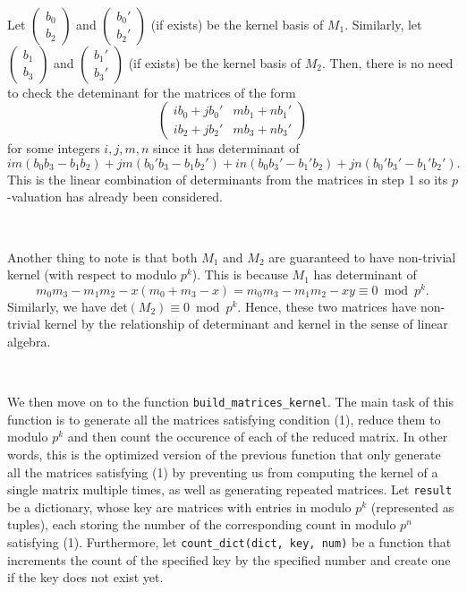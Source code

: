 \documentclass[letterpaper,12pt]{article}
\begin{document}
\

Let $\begin{pmatrix}b_0 \\ b_2 \end{pmatrix}$ and 
$\begin{pmatrix}b_0' \\ b_2' \end{pmatrix}$ (if exists) be the kernel basis of $M_1$.
Similarly, let $\begin{pmatrix}b_1 \\ b_3 \end{pmatrix}$ and 
$\begin{pmatrix}b_1' \\ b_3' \end{pmatrix}$ (if exists) be the kernel basis of $M_2$.
Then, there is no need to check the deteminant for the matrices of the form 
\[
\begin{pmatrix}
ib_0+jb_0' & mb_1+nb_1' \\
ib_2+jb_2' & mb_3+nb_3'
\end{pmatrix}
\]
for some integers $i,j,m,n$ since it has determinant of
\[
im(b_0b_3 - b_1b_2) + jm(b_0'b_3 - b_1b_2')
+ in(b_0b_3' - b_1'b_2) + jn(b_0'b_3' - b_1'b_2') .
\]
This is the linear combination of determinants from the matrices in step 1
so its $p$-valuation has already been considered.

\

Another thing to note is that both $M_1$ and $M_2$
are guaranteed to have non-trivial kernel (with respect to modulo $p^k$).
This is because $M_1$ has determinant of 
\[
m_0m_3 - m_1m_2 - x(m_0 + m_3 - x)
= m_0m_3 - m_1m_2 - xy
\equiv 0 \bmod p^k.
\]
Similarly, we have $\text{det}(M_2) \equiv 0 \bmod p^k$.
Hence, these two matrices have non-trivial kernel by the relationship 
of determinant and kernel in the sense of linear algebra.

\

We then move on to the function 
\texttt{build\_matrices\_kernel}.
The main task of this function is to generate all the matrices 
satisfying condition (1), reduce them to modulo $p^k$
and then count the occurence of each of the reduced matrix.
In other words, this is the optimized version of the previous function 
that only generate all the matrices satisfying (1)
by preventing us from computing the kernel of a single matrix multiple times,
as well as generating repeated matrices.
Let \texttt{result} be a dictionary, whose key are
matrices with entries in modulo $p^k$ (represented as tuples),
each storing the number of the corresponding count in modulo $p^n$ satisfying (1).
Furthermore, let \texttt{count\_dict(dict, key, num)} be a function 
that increments the count of the specified key by the specified number 
and create one if the key does not exist yet.
\end{document}
